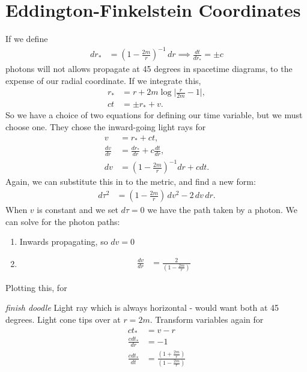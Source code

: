 \documentclass[a4paper, 11pt, normalem]{report}
\begin{document}
\section{Eddington-Finkelstein Coordinates}
If we define
\begin{align}
    dr_{*} &= \left(1-\frac{2m}{r}\right)^{-1}\,dr \implies \frac{dt}{dr_{*}} = \pm c
\end{align}
photons will not allows propagate at 45 degrees in spacetime diagrams, to the expense of our radial coordinate.
If we integrate this,
\begin{align}
    r_{*} &= r + 2m\log\bigg|\frac{r}{2m}-1\bigg|, \\
    ct &= \pm r_{*} + v.
\end{align}
So we have a choice of two equations for defining our time variable, but we must choose one.
They chose the inward-going light rays for
\begin{align}
    v &= r_{*} + ct, \\
    \frac{dv}{dr} &= \frac{dr_{*}}{dr} + c\frac{dt}{dr}, \\
    dv &= \left(1-\frac{2m}{r}\right)^{-1}dr + cdt.
\end{align}
Again, we can substitute this in to the metric, and find a new form:
\begin{align}
    d\tau^2 &= \left(1-\frac{2m}{r}\right)\,dv^2 - 2\,dv\,dr.
\end{align}
When $v$ is constant and we set $d\tau=0$ we have the path taken by a photon.
We can solve for the photon paths:
\begin{enumerate}
    \item Inwards propagating, so $dv = 0$
    \item
        \begin{align}
            \frac{dv}{dr} &= \frac{2}{\left(1-\frac{2m}{r}\right)}
        \end{align}
\end{enumerate}
Plotting this, for
\begin{figure}[H]
    \centering
\end{figure}
\emph{finish doodle}
Light ray which is always horizontal - would want both at 45 degrees.
Light cone tips over at $r=2m$.
Transform variables again for
\begin{align}
    ct_{*} &= v-r \\
    \frac{cdt_{*}}{dr} &= -1 \\
    \frac{cdt_{*}}{dt} &= \frac{\left(1+\frac{2m}{r}\right)}{\left(1-\frac{2m}{r}\right)}
\end{align}
\end{document}
